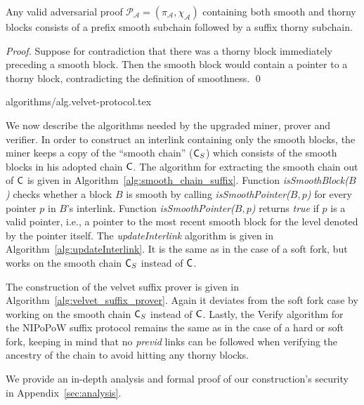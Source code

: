 \begin{lemma}
	Any valid adversarial proof $\mathcal{P_A} = (\pi_\mathcal{A}, \chi_\mathcal{A})$ containing both smooth and thorny blocks consists of a prefix smooth subchain followed by a suffix thorny subchain.
	\label{lem:adversarial_proof_scheme}
\end{lemma}
\begin{proof}
	Suppose for contradiction that there was a thorny block immediately preceding a smooth block. Then the smooth block would contain a pointer to a thorny block, contradicting the definition of smoothness.
	\qed
\end{proof}

{algorithms/alg.velvet-protocol.tex}

We now describe the algorithms needed by the upgraded miner, prover and verifier. In order to construct an interlink containing only the smooth blocks, the miner keeps a copy of the ``smooth chain'' ($\mathsf{C}_S$) which consists of the smooth blocks in his adopted chain $\mathsf{C}$. The algorithm for extracting the smooth chain out of $\mathsf{C}$ is given in Algorithm~\ref{alg:smooth_chain_suffix}. Function \emph{isSmoothBlock($B$)} checks whether a block $B$ is smooth by calling \textit{isSmoothPointer($B,p$)} for every pointer $p$ in $B$'s interlink. Function \emph{isSmoothPointer($B,p$)} returns \emph{true} if $p$ is a valid pointer, i.e., a pointer to the most recent smooth block for the level denoted by the pointer itself. The \emph{updateInterlink} algorithm is given in Algorithm~\ref{alg:updateInterlink}. It is the same as in the case of a soft fork, but works on the smooth chain $\mathsf{C}_S$ instead of $\mathsf{C}$.

The construction of the velvet suffix prover is given in Algorithm~\ref{alg:velvet_suffix_prover}. Again it deviates from the soft fork case by working on the smooth chain $\mathsf{C}_S$ instead of $\mathsf{C}$.
Lastly, the Verify algorithm for the NIPoPoW suffix protocol remains the same as in the case of a hard or soft fork, keeping in mind that no \emph{previd} links can be followed when verifying the ancestry of the chain to avoid hitting any thorny blocks.

We provide an in-depth analysis and formal proof of our construction's security in Appendix~\ref{sec:analysis}.